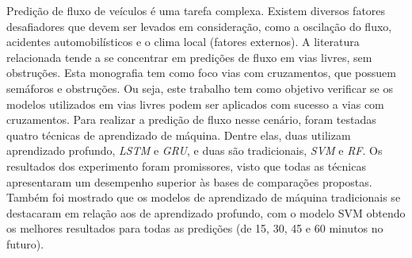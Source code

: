 Predição de fluxo de veículos é uma tarefa complexa. Existem diversos fatores desafiadores que devem ser levados em consideração, como a oscilação do fluxo, acidentes automobilísticos e o clima local (fatores externos). A literatura relacionada tende a se concentrar em predições de fluxo em vias livres, sem obstruções. Esta monografia tem como foco vias com cruzamentos, que possuem semáforos e obstruções. Ou seja, este trabalho tem como objetivo verificar se os modelos utilizados em vias livres podem ser aplicados com sucesso a vias com cruzamentos.  Para realizar a predição de fluxo nesse cenário, foram testadas quatro técnicas de aprendizado de máquina. Dentre elas, duas utilizam aprendizado profundo, \textit{\acrfull{LSTM}} e \textit{\acrfull{GRU}}, e duas são tradicionais, \textit{\acrfull{SVM}} e \textit{\acrfull{RF}}. Os resultados dos experimento foram promissores, visto que todas as técnicas apresentaram um desempenho superior às bases de comparações propostas. Também foi mostrado que os modelos de aprendizado de máquina tradicionais se destacaram em relação aos de aprendizado profundo, com o modelo \acrshort{SVM} obtendo os melhores resultados para todas as predições (de 15, 30, 45 e 60 minutos no futuro).

